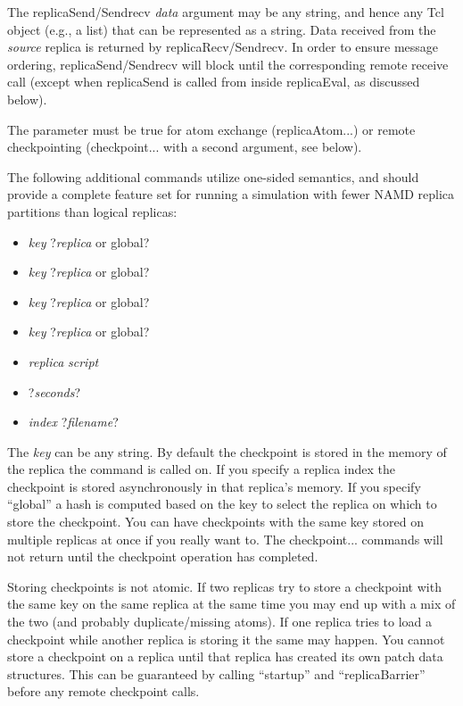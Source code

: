 The replicaSend/Sendrecv {\em data} argument may be any string,
and hence any Tcl object (e.g., a list) that can be represented as a string.
Data received from the {\em source} replica is returned by replicaRecv/Sendrecv.
In order to ensure message ordering, replicaSend/Sendrecv will block
until the corresponding remote receive call (except when replicaSend
is called from inside replicaEval, as discussed below).

The parameter {} must be true for 
atom exchange (replicaAtom...) or remote checkpointing (checkpoint... with a second argument, see below).

The following additional commands utilize one-sided semantics,
and should provide a complete feature set for running a simulation with
fewer NAMD replica partitions than logical replicas:

\begin{itemize}
  \item {} {\em key} ?{\em replica} or global?
  \item {} {\em key} ?{\em replica} or global?
  \item {} {\em key} ?{\em replica} or global?
  \item {} {\em key} ?{\em replica} or global?
  \item {} {\em replica} {\em script}
  \item {} ?{\em seconds}?
  \item {} {\em index} ?{\em filename}?
\end{itemize}

The {\em key} can be any string.
By default the checkpoint is stored in the memory of the replica the command is called on.
If you specify a replica index the checkpoint is stored asynchronously in that replica's memory.
If you specify ``global'' a hash is computed based on the key to select the replica on which
to store the checkpoint.
You can have checkpoints with the same key stored on multiple replicas at once if you really want to.
The checkpoint... commands will not return until the checkpoint operation has completed.

Storing checkpoints is not atomic.
If two replicas try to store a checkpoint with the same key on the same replica at the same
time you may end up with a mix of the two (and probably duplicate/missing atoms).
If one replica tries to load a checkpoint while another replica is storing it the same may happen.
You cannot store a checkpoint on a replica until that replica has created its own patch data structures.
This can be guaranteed by calling ``startup'' and ``replicaBarrier'' before any remote checkpoint calls.

